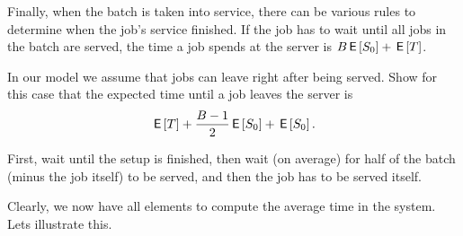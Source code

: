 Finally, when the batch is taken into service, there can be various rules to determine when the job's service finished. If the job has to wait until all jobs in the batch are served, the time a job spends at the server is $B \,\mathsf{E}\left[S_0\right] + \,\mathsf{E}\left[T\right]$. 

\begin{exercise}
In our model we assume that jobs can leave right after being served.  Show for this case that the expected time  until a job leaves the server is
\begin{equation*}
\,\mathsf{E}\left[T\right]  + \frac{B-1}{2}\,\mathsf{E}\left[S_0\right] +\,\mathsf{E}\left[S_0\right].
\end{equation*}
\begin{solution}
  First, wait until the setup is finished,  then wait (on average) for half of the batch (minus the job itself) to be served, and then the job has to be served itself.
\end{solution}
\end{exercise}

Clearly, we now have all elements to compute the average time in the system. Lets illustrate this. 

